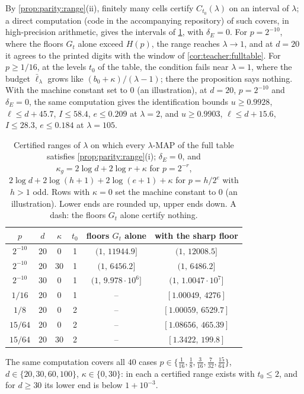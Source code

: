 By \cref{prop:parity:range}(ii), finitely many cells certify $C_{t_0}(\lambda)$ on an interval of $\lambda$; a direct computation (code in the accompanying repository) of such covers, in high-precision arithmetic, gives the intervals of \cref{tab:parity:ranges}, with $\delta_E=0$. For $p=2^{-10}$, where the floors $G_t$ alone exceed $H(p)$, the range reaches $\lambda\to1$, and at $d=20$ it agrees to the printed digits with the window of \cref{cor:teacher:fulltable}. For $p\ge1/16$, at the levels $t_0$ of the table, the condition fails near $\lambda=1$, where the budget $\bar\ell_\lambda$ grows like $(b_0+\kappa)/(\lambda-1)$; there the proposition says nothing. With the machine constant set to $0$ (an illustration), at $d=20$, $p=2^{-10}$ and $\delta_E=0$, the same computation gives the identification bounds $u\ge0.9928$, $\ell\le d+45.7$, $I\le58.4$, $e\le0.209$ at $\lambda=2$, and $u\ge0.9903$, $\ell\le d+15.6$, $I\le28.3$, $e\le0.184$ at $\lambda=105$.

\begin{table}[t]
\centering\small
\begin{tabular}{@{}cccc|cc@{}}
\toprule
$p$ & $d$ & $\kappa$ & $t_0$ & floors $G_t$ alone & with the sharp floor\\
\midrule
$2^{-10}$ & 20 & 0 & 1 & $(1,\,11944.9]$ & $(1,\,12008.5]$\\
$2^{-10}$ & 20 & 30 & 1 & $(1,\,6456.2]$ & $(1,\,6486.2]$\\
$2^{-10}$ & 30 & 0 & 1 & $(1,\,9.978\cdot10^6]$ & $(1,\,1.0047\cdot10^7]$\\
$1/16$ & 20 & 0 & 1 & -- & $[1.00049,\,4276]$\\
$1/8$ & 20 & 0 & 2 & -- & $[1.00059,\,6529.7]$\\
$15/64$ & 20 & 0 & 2 & -- & $[1.08656,\,465.39]$\\
$15/64$ & 20 & 30 & 2 & -- & $[1.3422,\,199.8]$\\
\bottomrule
\end{tabular}
\caption{Certified ranges of $\lambda$ on which every $\lambda$-MAP of the full table satisfies \cref{prop:parity:range}(i); $\delta_E=0$, and $\kappa_g=2\log d+2\log r+\kappa$ for $p=2^{-r}$, $2\log d+2\log(h+1)+2\log(e+1)+\kappa$ for $p=h/2^e$ with $h>1$ odd. Rows with $\kappa=0$ set the machine constant to $0$ (an illustration). Lower ends are rounded up, upper ends down. A dash: the floors $G_t$ alone certify nothing.}
\label{tab:parity:ranges}
\end{table}

The same computation covers all $40$ cases $p\in\{\frac1{16},\frac18,\frac3{16},\frac7{32},\frac{15}{64}\}$, $d\in\{20,30,60,100\}$, $\kappa\in\{0,30\}$: in each a certified range exists with $t_0\le2$, and for $d\ge30$ its lower end is below $1+10^{-3}$.

